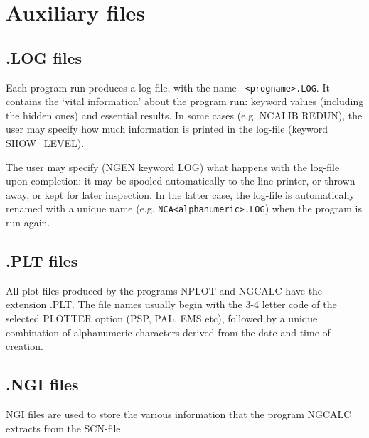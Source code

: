 
\section{Auxiliary \NEWSTAR files} 


\subsection{.LOG files} 
\label{log} 

	Each \NEWSTAR program run produces a log-file, with the name {\tt 
<progname>.LOG}.  It contains the `vital information' about the program run:
keyword values (including the hidden ones) and essential results.  In some
cases (e.g.  NCALIB REDUN), the user may specify how much information is
printed in the log-file (keyword SHOW\_LEVEL). 

	The user may specify (NGEN keyword LOG) what happens with the log-file
upon completion: it may be spooled automatically to the line printer, or thrown
away, or kept for later inspection.  In the latter case, the log-file is
automatically renamed with a unique name (e.g. {\tt NCA<alphanumeric>.LOG})
when the program is run again. 


\subsection{.PLT files} 
\label{plt} 

	All plot files produced by the programs NPLOT and NGCALC have the
extension .PLT.  The file names usually begin with the 3-4 letter code of the
selected PLOTTER option (PSP, PAL, EMS etc), followed by a unique combination
of alphanumeric characters derived from the date and time of creation. 


\subsection{.NGI files} 
\label{ngi} 

	NGI files are used to store the various information that the program 
NGCALC extracts from the SCN-file. 

